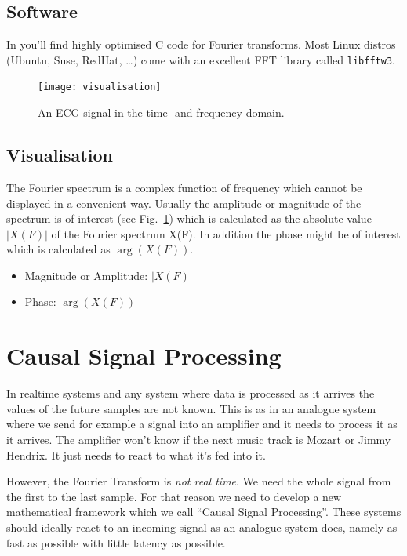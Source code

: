 \documentclass[12pt,a4paper]{article}
\begin{document}
\subsection{Software}
In \citet{NumericalRec2007} you'll find highly optimised C code
for Fourier transforms. Most Linux distros (Ubuntu, Suse, RedHat, \ldots)
come with an excellent FFT library called \texttt{libfftw3}.


\begin{figure}[!hbt]
\begin{center}
\mbox{\texttt{[image: visualisation]}}
\end{center}
\caption{
An ECG signal in the time- and frequency domain.
\label{visualisation}}
\end{figure}


\subsection{Visualisation}
The Fourier spectrum is a complex function of frequency which cannot
be displayed in a convenient way. Usually the amplitude or magnitude
of the spectrum is of interest (see Fig.~\ref{visualisation}) which is calculated as the
absolute value $|X(F)|$ of the Fourier spectrum X(F). In addition
the phase might be of interest which is calculated as $\arg(X(F))$.
\begin{itemize}
\item Magnitude or Amplitude: $|X(F)|$
\item Phase: $\arg(X(F))$
\end{itemize}

\clearpage





\section{Causal Signal Processing}

In realtime systems and any system where data is processed as it
arrives the values of the future samples are not known. This is as in
an analogue system where we send for example a signal into an
amplifier and it needs to process it as it arrives. The amplifier
won't know if the next music track is Mozart or Jimmy Hendrix. It just
needs to react to what it's fed into it.

However, the Fourier Transform is \textsl{not real time}.  We need the
whole signal from the first to the last sample.  For that reason we
need to develop a new mathematical framework which we call ``Causal
Signal Processing''. These systems should ideally react to an incoming
signal as an analogue system does, namely as fast as possible with
little latency as possible.
\end{document}
